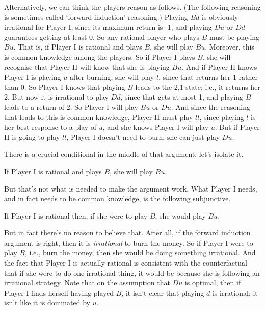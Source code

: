 Alternatively, we can think the players reason as follows. (The following reasoning is sometimes called `forward induction' reasoning.) Playing $Bd$ is obviously irrational for Player I, since its maximum return is -1, and playing $Du$ or $Dd$ guarantees getting at least 0. So any rational player who plays $B$ must be playing $Bu$. That is, if Player I is rational and plays $B$, she will play $Bu$. Moreover, this is common knowledge among the players. So if Player I plays $B$, she will recognise that Player II will know that she is playing $Bu$. And if Player II knows Player I is playing $u$ after burning, she will play $l$, since that returns her 1 rather than 0. So Player I knows that playing $B$ leads to the 2,1 state; i.e., it returns her 2. But now it is irrational to play $Dd$, since that gets at most 1, and playing $B$ leads to a return of 2. So Player I will play $Bu$ or $Du$. And since the reasoning that leads to this is common knowledge, Player II must play $ll$, since playing $l$ is her best response to a play of $u$, and she knows Player I will play $u$. But if Player II is going to play $ll$, Player I doesn't need to burn; she can just play $Du$.

There is a crucial conditional in the middle of that argument; let's isolate it.

\begin{itemize*}
\item If Player I is rational and plays $B$, she will play $Bu$.
\end{itemize*}

\noindent But that's not what is needed to make the argument work. What Player I needs, and in fact needs to be common knowledge, is the following subjunctive.

\begin{itemize*}
\item If Player I is rational then, if she were to play $B$, she would play $Bu$.
\end{itemize*}

\noindent But in fact there's no reason to believe that. After all, if the forward induction argument is right, then it is \textit{irrational} to burn the money. So if Player I were to play $B$, i.e., burn the money, then she would be doing something irrational. And the fact that Player I is actually rational is consistent with the counterfactual that if she were to do one irrational thing, it would be because she is following an irrational strategy. Note that on the assumption that $Du$ is optimal, then if Player I finds herself having played $B$, it isn't clear that playing $d$ is irrational; it isn't like it is dominated by $u$.

